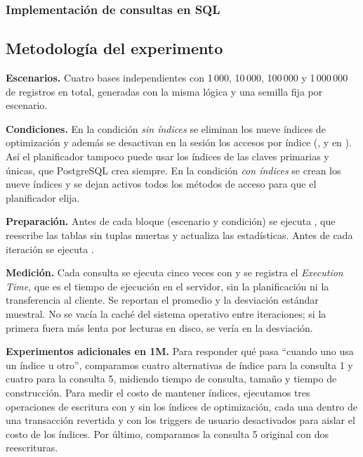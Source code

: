 \subsubsection{Implementación de consultas en SQL}


\subsection{Metodología del experimento}
\label{sec:metodologia}

\textbf{Escenarios.} Cuatro bases independientes con 1\,000, 10\,000, 100\,000 y 1\,000\,000 de registros en total, generadas con la misma lógica y una semilla fija por escenario.

\textbf{Condiciones.} En la condición \emph{sin índices} se eliminan los nueve índices de optimización y además se desactivan en la sesión los accesos por índice (,  y  en ). Así el planificador tampoco puede usar los índices de las claves primarias y únicas, que PostgreSQL crea siempre. En la condición \emph{con índices} se crean los nueve índices y se dejan activos todos los métodos de acceso para que el planificador elija.

\textbf{Preparación.} Antes de cada bloque (escenario y condición) se ejecuta , que reescribe las tablas sin tuplas muertas y actualiza las estadísticas. Antes de cada iteración se ejecuta .

\textbf{Medición.} Cada consulta se ejecuta cinco veces con  y se registra el \emph{Execution Time}, que es el tiempo de ejecución en el servidor, sin la planificación ni la transferencia al cliente. Se reportan el promedio y la desviación estándar muestral. No se vacía la caché del sistema operativo entre iteraciones; si la primera fuera más lenta por lecturas en disco, se vería en la desviación.

\textbf{Experimentos adicionales en 1M.} Para responder qué pasa ``cuando uno usa un índice u otro'', comparamos cuatro alternativas de índice para la consulta 1 y cuatro para la consulta 5, midiendo tiempo de consulta, tamaño y tiempo de construcción. Para medir el costo de mantener índices, ejecutamos tres operaciones de escritura con y sin los índices de optimización, cada una dentro de una transacción revertida y con los triggers de usuario desactivados para aislar el costo de los índices. Por último, comparamos la consulta 5 original con dos reescrituras.

